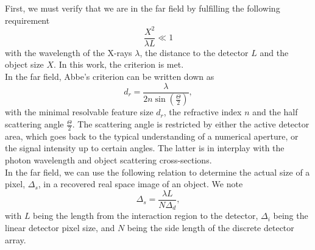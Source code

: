 %
First, we must verify that we are in the far field by fulfilling the following requirement \cite{Williams-2010-NJP}
\begin{equation}
\frac{X^{2}}{\lambda L} \ll 1
\label{eq:far-field-test}
\end{equation}
with the wavelength of the X-rays $\lambda$, the distance to the detector $L$ and the object size $X$. In this work, the criterion is met.\\[1\baselineskip]
%
In the far field, Abbe's criterion can be written down as
\begin{equation}
    d_r = \frac{\lambda}{2n \sin(\frac{\Theta}{2})},
		\label{eq:abbe-criterion}
\end{equation}
with the minimal resolvable feature size $d_r$, the refractive index $n$ and the half scattering angle $\frac{\Theta}{2}$. The scattering angle is restricted by either the active detector area, which goes back to the typical understanding of a numerical aperture, or the signal intensity up to certain angles. The latter is in interplay with the photon wavelength and object scattering cross-sections.\\[1\baselineskip]
In the far field, we can use the following relation to determine the actual size of a pixel, $\Delta_{s}$, in a recovered real space image of an object. We note \cite{Williams-2010-NJP}
\begin{equation}
    \Delta_{s} = \frac{\lambda L}{N \Delta_{d}},
\label{eq:relation-pixel-fourier}
\end{equation}
with $L$ being the length from the interaction region to the detector, $\Delta_{i}$ being the linear detector pixel size, and $N$ being the side length of the discrete detector array.\\[1\baselineskip]
%
